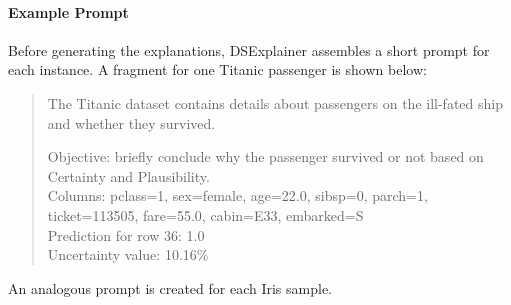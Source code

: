\documentclass[acmlarge]{acmart}
\begin{document}
\paragraph{Example Prompt}
Before generating the explanations, DSExplainer assembles a short prompt for each instance. A fragment for one Titanic passenger is shown below:
\begin{quote}
The Titanic dataset contains details about passengers on the ill-fated ship and whether they survived.

Objective: briefly conclude why the passenger survived or not based on Certainty and Plausibility.\\
Columns: pclass=1, sex=female, age=22.0, sibsp=0, parch=1, ticket=113505, fare=55.0, cabin=E33, embarked=S\\
Prediction for row 36: 1.0\\
Uncertainty value: 10.16\%
\end{quote}
An analogous prompt is created for each Iris sample.
\end{document}
